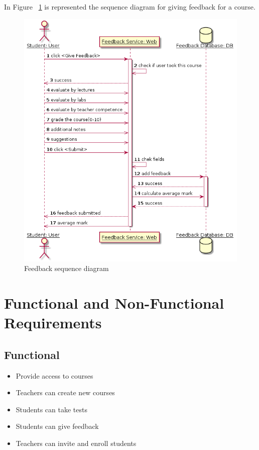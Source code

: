 \documentclass[12pt,a4paper,titlepage]{article}
\begin{document}
In Figure ~\ref{fig:feedback} is represented the sequence diagram for giving feedback for a course.
\begin{figure}[H]
\includegraphics[width=\textwidth]{feedback}
\caption{Feedback sequence diagram}
\centering
\label{fig:feedback}
\end{figure}


\section{Functional and Non-Functional Requirements}
\subsection{Functional}
\begin{itemize}
	\item Provide access to courses
	\item Teachers can create new courses
	\item Students can take tests
	\item Students can give feedback
	\item Teachers can invite and enroll students
\end{itemize}
\end{document}
